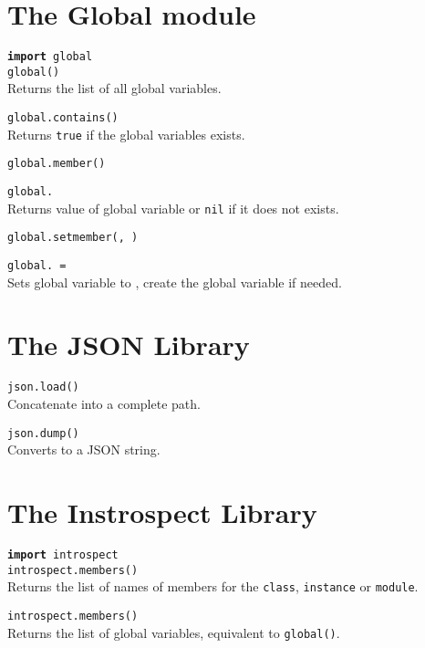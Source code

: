 \section*{The Global module}

\hangpar \texttt{\textbf{import} global}\\

\hangpar \texttt{global()}\\
Returns the list of all global variables.

\hangpar \texttt{global.contains(}\texttt{)} \\
Returns \texttt{true} if the global variables exists.

\hangpar \texttt{global.member(}\texttt{)}

\hangpar \texttt{global.} \\
Returns value of global variable  or \texttt{nil} if it does not exists.

\hangpar \texttt{global.setmember(}\texttt{, }\texttt{)}

\hangpar \texttt{global.}\texttt{ = } \\
Sets global variable  to , create the global variable if needed.

\section*{The JSON Library}

\hangpar \texttt{json.load(}\texttt{)} \\
Concatenate  into a complete path.

\hangpar \texttt{json.dump(}\texttt{)} \\
Converts  to a JSON string.

\section*{The Instrospect Library}

\hangpar \texttt{\textbf{import} introspect}\\

\hangpar \texttt{introspect.members(}\texttt{)} \\
Returns the list of names of members for the \texttt{class}, \texttt{instance} or \texttt{module}.

\hangpar \texttt{introspect.members()} \\
Returns the list of global variables, equivalent to \texttt{global()}.

